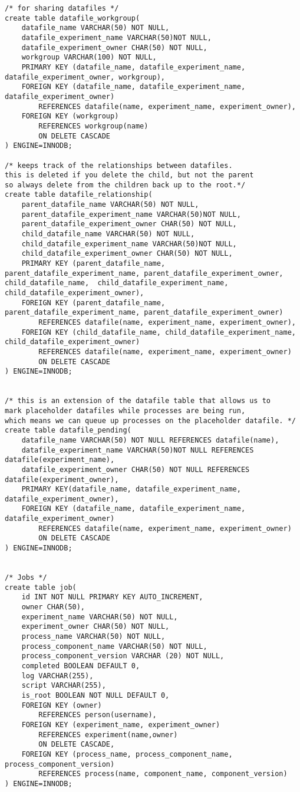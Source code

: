 \begin{tiny}
\begin{verbatim}
/* for sharing datafiles */
create table datafile_workgroup(
	datafile_name VARCHAR(50) NOT NULL,
	datafile_experiment_name VARCHAR(50)NOT NULL,
	datafile_experiment_owner CHAR(50) NOT NULL,
	workgroup VARCHAR(100) NOT NULL,
	PRIMARY KEY (datafile_name, datafile_experiment_name, datafile_experiment_owner, workgroup),
	FOREIGN KEY (datafile_name, datafile_experiment_name, datafile_experiment_owner)
		REFERENCES datafile(name, experiment_name, experiment_owner),
	FOREIGN KEY (workgroup) 
		REFERENCES workgroup(name)
		ON DELETE CASCADE
) ENGINE=INNODB;

/* keeps track of the relationships between datafiles.
this is deleted if you delete the child, but not the parent
so always delete from the children back up to the root.*/
create table datafile_relationship(
	parent_datafile_name VARCHAR(50) NOT NULL,
	parent_datafile_experiment_name VARCHAR(50)NOT NULL,
	parent_datafile_experiment_owner CHAR(50) NOT NULL,
	child_datafile_name VARCHAR(50) NOT NULL,
	child_datafile_experiment_name VARCHAR(50)NOT NULL,
	child_datafile_experiment_owner CHAR(50) NOT NULL,
	PRIMARY KEY (parent_datafile_name, parent_datafile_experiment_name, parent_datafile_experiment_owner, child_datafile_name, 	child_datafile_experiment_name, child_datafile_experiment_owner),
	FOREIGN KEY (parent_datafile_name, parent_datafile_experiment_name, parent_datafile_experiment_owner)
		REFERENCES datafile(name, experiment_name, experiment_owner),
	FOREIGN KEY (child_datafile_name, child_datafile_experiment_name, child_datafile_experiment_owner)
		REFERENCES datafile(name, experiment_name, experiment_owner)
		ON DELETE CASCADE
) ENGINE=INNODB;


/* this is an extension of the datafile table that allows us to
mark placeholder datafiles while processes are being run,
which means we can queue up processes on the placeholder datafile. */
create table datafile_pending(
	datafile_name VARCHAR(50) NOT NULL REFERENCES datafile(name),
	datafile_experiment_name VARCHAR(50)NOT NULL REFERENCES datafile(experiment_name),
	datafile_experiment_owner CHAR(50) NOT NULL REFERENCES datafile(experiment_owner),
	PRIMARY KEY(datafile_name, datafile_experiment_name, datafile_experiment_owner),
	FOREIGN KEY (datafile_name, datafile_experiment_name, datafile_experiment_owner)
		REFERENCES datafile(name, experiment_name, experiment_owner)
		ON DELETE CASCADE
) ENGINE=INNODB;


/* Jobs */
create table job(
	id INT NOT NULL PRIMARY KEY AUTO_INCREMENT,
	owner CHAR(50),
	experiment_name VARCHAR(50) NOT NULL,
	experiment_owner CHAR(50) NOT NULL,
	process_name VARCHAR(50) NOT NULL,
	process_component_name VARCHAR(50) NOT NULL,
	process_component_version VARCHAR (20) NOT NULL,
	completed BOOLEAN DEFAULT 0,
	log VARCHAR(255),
	script VARCHAR(255),
	is_root BOOLEAN NOT NULL DEFAULT 0,
	FOREIGN KEY (owner)
		REFERENCES person(username),
	FOREIGN KEY (experiment_name, experiment_owner) 
		REFERENCES experiment(name,owner)
		ON DELETE CASCADE,
	FOREIGN KEY (process_name, process_component_name, process_component_version) 
		REFERENCES process(name, component_name, component_version)
) ENGINE=INNODB;



\end{verbatim}
\end{tiny}
